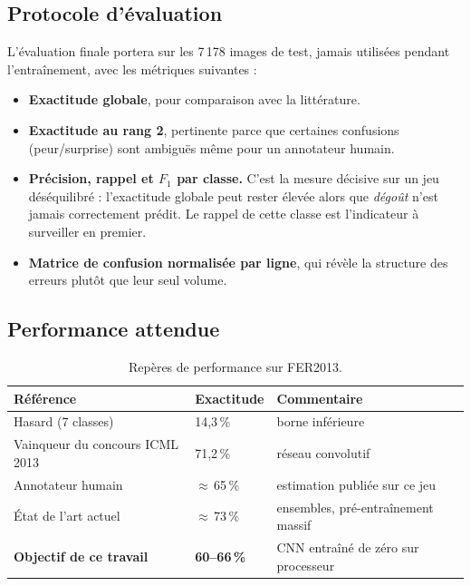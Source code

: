 \documentclass[11pt,a4paper]{article}
\begin{document}
\subsection{Protocole d'évaluation}

L'évaluation finale portera sur les 7\,178 images de test, jamais utilisées
pendant l'entraînement, avec les métriques suivantes :

\begin{itemize}[leftmargin=*,itemsep=1pt]
\item \textbf{Exactitude globale}, pour comparaison avec la littérature.
\item \textbf{Exactitude au rang 2}, pertinente parce que certaines confusions
      (peur/surprise) sont ambiguës même pour un annotateur humain.
\item \textbf{Précision, rappel et $F_1$ par classe.} C'est la mesure décisive
      sur un jeu déséquilibré : l'exactitude globale peut rester élevée alors que
      \emph{dégoût} n'est jamais correctement prédit. Le rappel de cette classe
      est l'indicateur à surveiller en premier.
\item \textbf{Matrice de confusion normalisée par ligne}, qui révèle la
      structure des erreurs plutôt que leur seul volume.
\end{itemize}

\subsection{Performance attendue}
\label{sec:plafond}

\begin{table}[h]
\centering
\small
\begin{tabular}{lll}
\toprule
\textbf{Référence} & \textbf{Exactitude} & \textbf{Commentaire} \\
\midrule
Hasard (7 classes) & 14{,}3\,\% & borne inférieure \\
Vainqueur du concours ICML 2013 & 71{,}2\,\% & réseau convolutif \\
Annotateur humain & $\approx$\,65\,\% & estimation publiée sur ce jeu \\
État de l'art actuel & $\approx$\,73\,\% & ensembles, pré-entraînement massif \\
\midrule
\textbf{Objectif de ce travail} & \textbf{60--66\,\%} & CNN entraîné de zéro sur processeur \\
\bottomrule
\end{tabular}
\caption{Repères de performance sur FER2013.}
\end{table}
\end{document}
